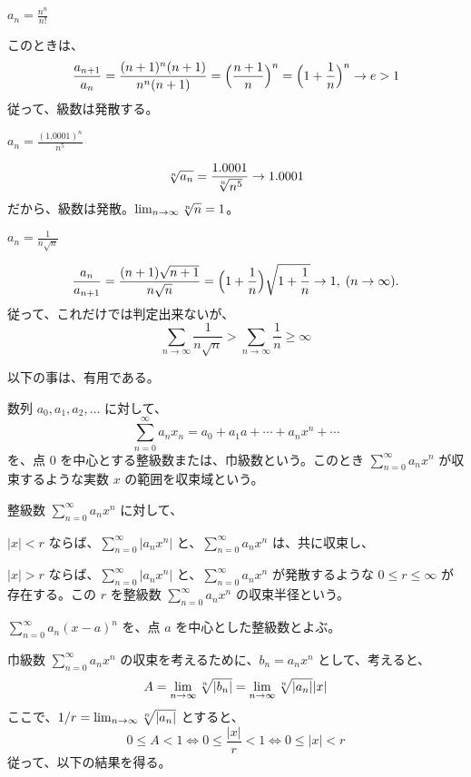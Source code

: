 \begin{eg}
${\displaystyle a_n = \frac{n^n}{n!}}$

\smallskip
このときは、
$$\frac{a_{n+1}}{a_n} = \frac{(n+1)^n(n+1)}{n^n(n+1)} = \Bigl(\frac{n+1}{n}\Bigr)^n = \Bigl(1+\frac1n\Bigr)^n \to e > 1$$
従って、級数は発散する。
\end{eg}

\begin{eg}
${\displaystyle a_n = \frac{(1.0001)^n}{n^5}}$

\smallskip
$$\root{n}\of{a_n} = \frac{1.0001}{\root{n}\of{n^5}} \to 1.0001$$
だから、級数は発散。$\lim_{n\to \infty}\root{n}\of{n} = 1$。
\end{eg}

\begin{eg}
${\displaystyle a_n = \frac{1}{n\sqrt{n}}}$

\smallskip
$$\frac{a_n}{a_{n+1}} = \frac{(n+1)\sqrt{n+1}}{n\sqrt{n}} = \Bigl(1+\frac1n\Bigr)\sqrt{1+\frac1n} \to 1, \;(n\to \infty).$$
従って、これだけでは判定出来ないが、
$$\sum_{n\to\infty}\frac{1}{n\sqrt{n}} > \sum_{n\to\infty}\frac{1}{n} \geq \infty$$
\end{eg}

以下の事は、有用である。
\begin{center}\large
{}
\end{center}


\begin{definition}
数列 $a_0, a_1, a_2, \ldots $ に対して、
$$\sum_{n=0}^\infty a_nx_n = a_0 + a_1a + \cdots + a_nx^n + \cdots$$
を、点 $0$ を中心とする整級数または、巾級数という。このとき $\sum_{n=0}^\infty a_nx^n$ が収束するような実数 $x$ の範囲を収束域という。
\end{definition}

\begin{prop} [Abel]
整級数 $\sum_{n=0}^\infty a_nx^n$ に対して、

$|x|<r$ ならば、$\sum_{n=0}^\infty |a_nx^n|$ と、$\sum_{n=0}^\infty a_nx^n$ は、共に収束し、

$|x|>r$ ならば、$\sum_{n=0}^\infty |a_nx^n|$ と、$\sum_{n=0}^\infty a_nx^n$ が発散するような $0\leq r\leq \infty$ が存在する。この $r$ を整級数 $\sum_{n=0}^\infty a_nx^n$ の収束半径という。
\end{prop}

\note $\sum_{n=0}^\infty a_n(x-a)^n$ を、点 $a$ を中心とした整級数とよぶ。

\medskip
巾級数 $\sum_{n=0}^\infty a_nx^n$ の収束を考えるために、$b_n = a_nx^n$ として、考えると、
$$A = \lim_{n\to\infty}\root{n}\of{|b_n|} = \lim_{n\to\infty}\root{n}\of{|a_n|}|x|$$
ここで、$1/r = \lim_{n\to\infty}\root{n}\of{|a_n|}$ とすると、
$$0\leq A <1 \Leftrightarrow 0\leq \frac{|x|}r < 1 \Leftrightarrow 0\leq |x| < r$$
従って、以下の結果を得る。

